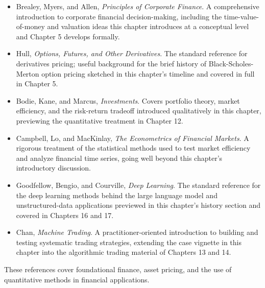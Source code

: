 \documentclass[../ai_in_finance]{subfiles}
\begin{document}
\begin{itemize}
    \item Brealey, Myers, and Allen, \emph{Principles of Corporate Finance}. A comprehensive introduction to corporate financial decision-making, including the time-value-of-money and valuation ideas this chapter introduces at a conceptual level and Chapter 5 develops formally.
    \item Hull, \emph{Options, Futures, and Other Derivatives}. The standard reference for derivatives pricing; useful background for the brief history of Black-Scholes-Merton option pricing sketched in this chapter's timeline and covered in full in Chapter 5.
    \item Bodie, Kane, and Marcus, \emph{Investments}. Covers portfolio theory, market efficiency, and the risk-return tradeoff introduced qualitatively in this chapter, previewing the quantitative treatment in Chapter 12.
    \item Campbell, Lo, and MacKinlay, \emph{The Econometrics of Financial Markets}. A rigorous treatment of the statistical methods used to test market efficiency and analyze financial time series, going well beyond this chapter's introductory discussion.
    \item Goodfellow, Bengio, and Courville, \emph{Deep Learning}. The standard reference for the deep learning methods behind the large language model and unstructured-data applications previewed in this chapter's history section and covered in Chapters 16 and 17.
    \item Chan, \emph{Machine Trading}. A practitioner-oriented introduction to building and testing systematic trading strategies, extending the case vignette in this chapter into the algorithmic trading material of Chapters 13 and 14.
\end{itemize}

These references cover foundational finance, asset pricing, and the use of quantitative methods in financial applications.
\end{document}

